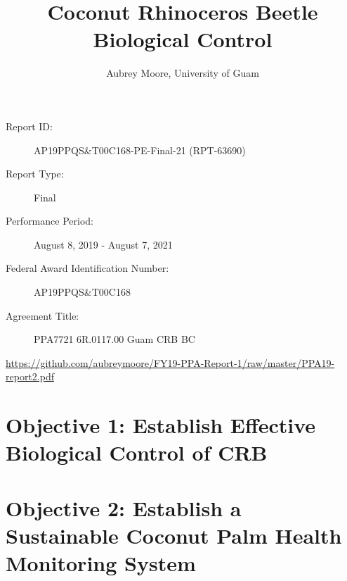 \documentclass[12pt,letterpaper,english,bibliography=totocnumbered,abstract=on]{scrartcl}
\begin{document}
\titlehead{USDA-APHIS Final Report}
\title{Coconut Rhinoceros Beetle Biological Control}
\author{Aubrey Moore, University of Guam}
\maketitle
\begin{description}	
	\item[Report ID:] AP19PPQS\&T00C168-PE-Final-21  (RPT-63690)
	\item[Report Type:] Final
	\item[Performance Period:] August 8, 2019 - August 7, 2021
	\item[Federal Award Identification Number:] AP19PPQS\&T00C168
	\item[Agreement Title:] PPA7721 6R.0117.00 Guam CRB BC
\end{description}

\begin{footnotesize}
\url{https://github.com/aubreymoore/FY19-PPA-Report-1/raw/master/PPA19-report2.pdf}
\end{footnotesize}

\newpage{}
\tableofcontents{}

\newpage

\listoftodos

\newpage

\section{Objective 1: Establish Effective Biological Control of CRB}

\begin{refsection}
\cite{CompleteMitochondrialGenome}
\printbibliography[heading=none]
\end{refsection}

\clearpage
\section{Objective 2: Establish a Sustainable Coconut Palm Health Monitoring System}
\end{document}
